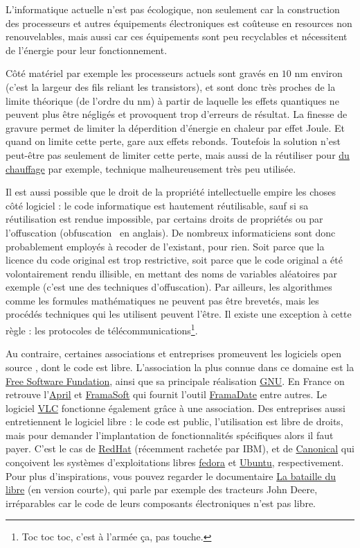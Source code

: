 \documentclass[10pt]{article}
\begin{document}
L'informatique actuelle n'est pas écologique, non seulement car la construction
des processeurs et autres équipements électroniques est coûteuse en resources
non renouvelables, mais aussi car ces équipements sont peu recyclables
et nécessitent de l'énergie pour leur fonctionnement.

Côté matériel par exemple les processeurs actuels sont gravés en $10$ nm environ (c'est la largeur des fils reliant les transistors),
et sont donc très proches de la limite théorique (de l'ordre du nm) à partir de laquelle les effets quantiques ne peuvent
plus être négligés et provoquent trop d'erreurs de résultat. La finesse de gravure permet
de limiter la déperdition d'énergie en chaleur par effet Joule.
Et quand on limite cette perte, gare aux effets rebonds.
Toutefois la solution n'est peut-être pas seulement de limiter cette perte,
mais aussi de la réutiliser pour \href{https://qarnot.com/fr}{du chauffage}
par exemple, technique malheureusement très peu utilisée.

Il est aussi possible que le droit de la propriété intellectuelle empire les choses côté logiciel : le code informatique est hautement réutilisable,
sauf si sa réutilisation est rendue impossible, par certains droits de propriétés ou par l'offuscation (\og obfuscation \fg~en anglais).
De nombreux informaticiens sont donc probablement employés à recoder de l'existant, pour rien. Soit parce que la
licence du code original est trop restrictive, soit parce que le code original a été volontairement rendu illisible, en mettant
des noms de variables aléatoires par exemple (c'est une des techniques d'offuscation). Par ailleurs, les algorithmes comme
les formules mathématiques ne peuvent pas être brevetés, mais les procédés techniques qui les utilisent peuvent l'être. Il existe
une exception à cette règle : les protocoles de télécommunications\footnote{Toc toc toc, c'est à l'armée ça, pas touche.}.

Au contraire, certaines associations et entreprises promeuvent les logiciels \og open source \fg, dont le code est libre.
L'association la plus connue dans ce domaine est la \href{https://www.fsf.org/}{Free Software Fundation}, ainsi que
sa principale réalisation \href{https://www.gnu.org/}{GNU}. En France on retrouve l'\href{https://www.april.org/}{April} et
\href{https://framasoft.org/fr/}{FramaSoft} qui fournit l'outil \href{https://framadate.org/}{FramaDate} entre autres.
Le logiciel \href{https://www.videolan.org/index.fr.html}{VLC} fonctionne également grâce à une association.
Des entreprises aussi entretiennent le logiciel libre : le code est public, l'utilisation
est libre de droits, mais pour demander l'implantation de fonctionnalités spécifiques alors il faut
payer. C'est le cas de \href{https://www.redhat.com/fr}{RedHat} (récemment rachetée par IBM), et de \href{https://www.canonical.com/}{Canonical}
qui conçoivent les systèmes d'exploitations libres \href{https://getfedora.org/fr/}{fedora} et \href{https://www.ubuntu.com/download}{Ubuntu}, respectivement.
Pour plus d'inspirations, vous pouvez regarder le documentaire \href{https://www.labatailledulibre.org/}{La bataille du libre}
(en version courte), qui parle par exemple des tracteurs John Deere, irréparables car le code de leurs composants électroniques n'est pas libre.
\end{document}
